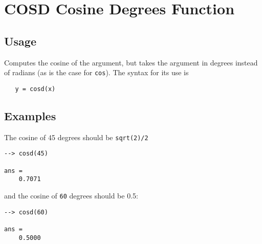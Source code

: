 \section{COSD Cosine Degrees Function}

\subsection{Usage}

Computes the cosine of the argument, but takes
the argument in degrees instead of radians (as is the case
for \verb|cos|). The syntax for its use is
\begin{verbatim}
   y = cosd(x)
\end{verbatim}
\subsection{Examples}

The cosine of 45 degrees should be \verb|sqrt(2)/2|
\begin{verbatim}
--> cosd(45)

ans = 
    0.7071 
\end{verbatim}
and the cosine of \verb|60| degrees should be 0.5:
\begin{verbatim}
--> cosd(60)

ans = 
    0.5000 
\end{verbatim}
